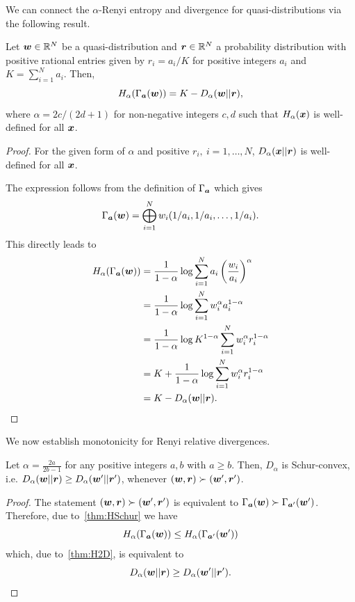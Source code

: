 \documentclass[pra,
aps,
twocolumn,
superscriptaddress,
groupedaddress,
nofootinbib,
reprint
]{revtex4-1}
\begin{document}
We can connect the $\alpha$-Renyi entropy and divergence for quasi-distributions via the following result.

\begin{theorem}\label{thm:H2D}
	Let $\boldsymbol{w}\in \mathbb{R}^N$ be a quasi-distribution and $\boldsymbol{r} \in \mathbb{R}^N$ a probability distribution with positive rational entries given by $r_i = a_i/K$ for positive integers $a_i$ and $K = \sum_{i=1}^N a_i$.
	Then,
	\begin{equation}
		H_\alpha(\Gamma_{\bm{a}}(\boldsymbol{w})) = K - D_\alpha(\boldsymbol{w} ||\boldsymbol{r}),
	\end{equation}
	where $\alpha = 2c / (2d+1)$ for non-negative integers $c,d$ such that $H_\alpha(\boldsymbol{x})$ is well-defined for all $\boldsymbol{x}$.
\end{theorem}
\begin{proof}
	For the given form of $\alpha$ and positive $r_i,\ i=1,\dots,N$, $D_\alpha(\boldsymbol{x} ||\boldsymbol{r})$ is well-defined for all $\boldsymbol{x}$.

	The expression follows from the definition of $\Gamma_{\bm{a}}$ which gives
	\begin{equation}
		\Gamma_{\bm{a}}(\boldsymbol{w}) = \bigoplus_{i=1}^N w_i (1/a_i, 1/a_i, \dots, 1/a_i).
	\end{equation}
	This directly leads to
	\begin{align}
		H_\alpha(\Gamma_{\bm{a}}(\boldsymbol{w})) &= \frac{1}{1-\alpha} \log \sum_{i=1}^N a_i \left( \frac{w_i}{a_i} \right)^\alpha \nonumber\\
		&= \frac{1}{1-\alpha} \log \sum_{i=1}^N w_i^{\alpha} a_i^{1-\alpha} \nonumber\\
		&= \frac{1}{1-\alpha} \log K^{1-\alpha} \sum_{i=1}^N w_i^{\alpha} r_i^{1-\alpha} \nonumber\\
		&= K + \frac{1}{1-\alpha} \log \sum_{i=1}^N w_i^{\alpha} r_i^{1-\alpha} \nonumber\\
		&= K - D_\alpha(\boldsymbol{w} ||\boldsymbol{r}).
	\end{align}
\end{proof}

We now establish monotonicity for Renyi relative divergences.
\begin{theorem}\label{thm:DSchur}
	Let $\alpha = \frac{2a}{2b-1}$ for any positive integers $a,b$ with $a \geq b$. 
	Then, $D_\alpha$ is Schur-convex, i.e. $D_\alpha(\boldsymbol{w} || \boldsymbol{r}) \geq D_\alpha(\boldsymbol{w}' || \boldsymbol{r}')$, whenever $(\boldsymbol{w}, \boldsymbol{r}) \succ (\boldsymbol{w}', \boldsymbol{r}')$.
\end{theorem}
\begin{proof}
	The statement $(\boldsymbol{w}, \boldsymbol{r}) \succ (\boldsymbol{w}', \boldsymbol{r}')$ is equivalent to $\Gamma_{\bm{a}}(\boldsymbol{w}) \succ \Gamma_{\bm{a}'}(\boldsymbol{w}')$.
	Therefore, due to~\cref{thm:HSchur} we have
	\begin{equation}
		H_\alpha(\Gamma_{\bm{a}}(\boldsymbol{w})) \leq H_\alpha(\Gamma_{\bm{a}'}(\boldsymbol{w}'))
	\end{equation}
	which, due to~\cref{thm:H2D}, is equivalent to
	\begin{equation}
		D_\alpha(\boldsymbol{w} ||\boldsymbol{r}) \geq D_\alpha(\boldsymbol{w}' ||\boldsymbol{r}').
	\end{equation}
\end{proof}
\end{document}
